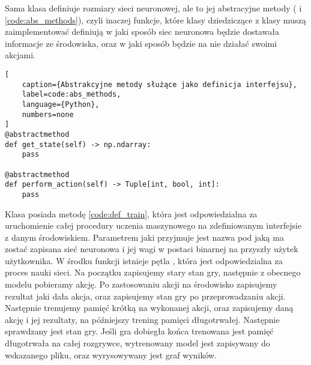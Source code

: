 Sama klasa definiuje rozmiary sieci neuronowej, ale to jej abstracyjne metody ( i  \ref{code:abs_methods}), czyli inaczej funkcje, które klasy dziedziczące z klasy  muszą zaimplementować definiują w jaki sposób siec neuronowa będzie dostawała informacje ze środowiska, oraz w jaki sposób będzie na nie działać swoimi akcjami.

\begin{onepage}
    \begin{lstlisting}[
    caption={Abstrakcyjne metody służące jako definicja interfejsu},
    label=code:abs_methods,
    language={Python},
    numbers=none
]
@abstractmethod
def get_state(self) -> np.ndarray:
    pass

@abstractmethod
def perform_action(self) -> Tuple[int, bool, int]:
    pass
\end{lstlisting}
\end{onepage}

Klasa  posiada metodę  \ref{code:def_train}, która jest odpowiedzialna za uruchomienie całej procedury uczenia maszynowego na zdefiniowanym interfejsie z danym środowiskiem. Parametrem jaki przyjmuje jest nazwa pod jaką ma zostać zapisana sieć neuronowa i jej wagi w postaci binarnej na przyszły użytek użytkownika. W środku funkcji istnieje pętla , która jest odpowiedzialna za proces nauki sieci. Na początku zapisujemy stary stan gry, następnie z obecnego modelu pobieramy akcję. Po zastosowaniu akcji na środowisko zapisujemy rezultat jaki dała akcja, oraz zapisujemy stan gry po przeprowadzaniu akcji. Następnie trenujemy pamięć krótką na wykonanej akcji, oraz zapisujemy daną akcję i jej rezultaty, na późniejszy trening pamięci długotrwałej. Następnie sprawdzany jest stan gry. Jeśli gra dobiegła końca trenowana jest pamięć długotrwała na całej rozgrywce, wytrenowany model jest zapisywany do wskazanego pliku, oraz wyrysowywany jest graf wyników.

